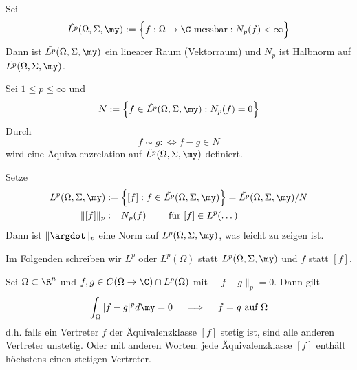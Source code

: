 \begin{df} \label{2.9}
	Sei 
	\[
		\tilde {L^p} (\Omega, \Sigma, \my)
		:= \Big\{ f : \Omega \to \C \text{ messbar} : N_p(f) < \infty \Big\}
	\]
	Dann ist $\tilde{L^p}(\Omega, \Sigma, \my)$ ein linearer Raum (Vektorraum) und $N_p$ ist Halbnorm auf $\tilde{L^p}(\Omega, \Sigma, \my)$.
\end{df}

\begin{df} \label{2.10}
	Sei $1 \le p \le \infty$ und
	\begin{align*}
		N := \Big\{ f \in \tilde {L^p}(\Omega, \Sigma, \my) : N_p(f) = 0 \Big\}
	\end{align*}
	Durch
	\[
		f \sim g :\iff f-g \in N
	\]
	wird eine Äquivalenzrelation auf $\tilde{L^p}(\Omega, \Sigma, \my)$ definiert.

	Setze
	\begin{align*}
		L^p(\Omega, \Sigma, \my)
		&:= \Big\{ [f] : f \in \tilde{L^p}(\Omega, \Sigma, \my) \Big\}
		= \tilde {L^p} (\Omega, \Sigma, \my) / N \\
		\| [f] \|_p &:= N_p(f) \qquad \text{ für } [f] \in L^p(\dots)
	\end{align*}
	Dann ist $\|\argdot\|_p$ eine Norm auf $L^p(\Omega, \Sigma, \my)$, was leicht zu zeigen ist.

	Im Folgenden schreiben wir $L^p$ oder $L^p(\Omega)$ statt $L^p(\Omega, \Sigma, \my)$ und $f$ statt $[f]$.
\end{df}

\begin{nt} \label{2.11}
	Sei $\Omega \subset \R^n$ und $f,g \in C(\Omega \to \C) \cap L^p(\Omega)$ mit $\|f-g\|_p = 0$.
	Dann gilt
	\begin{align*}
		\int_{\Omega} |f-g|^p d\my = 0
		\quad\implies\quad
		f = g \text{ auf $\Omega$}
	\end{align*}
	d.h. falls ein Vertreter $f$ der Äquivalenzklasse $[f]$ stetig ist, sind alle anderen Vertreter unstetig.
	Oder mit anderen Worten: jede Äquivalenzklasse $[f]$ enthält höchstens einen stetigen Vertreter.
\end{nt}

